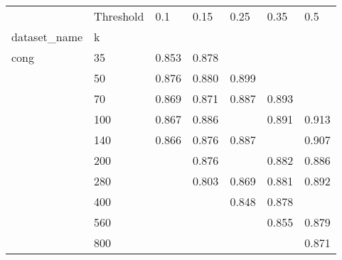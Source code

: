 \begin{tabular}{lllllll}
\toprule
     & Threshold &    0.1 &   0.15 &   0.25 &   0.35 &    0.5 \\
dataset_name & k &        &        &        &        &        \\
\midrule
cong & 35  &  0.853 &  0.878 &        &        &        \\
     & 50  &  0.876 &  0.880 &  0.899 &        &        \\
     & 70  &  0.869 &  0.871 &  0.887 &  0.893 &        \\
     & 100 &  0.867 &  0.886 &        &  0.891 &  0.913 \\
     & 140 &  0.866 &  0.876 &  0.887 &        &  0.907 \\
     & 200 &        &  0.876 &        &  0.882 &  0.886 \\
     & 280 &        &  0.803 &  0.869 &  0.881 &  0.892 \\
     & 400 &        &        &  0.848 &  0.878 &        \\
     & 560 &        &        &        &  0.855 &  0.879 \\
     & 800 &        &        &        &        &  0.871 \\
\bottomrule
\end{tabular}
